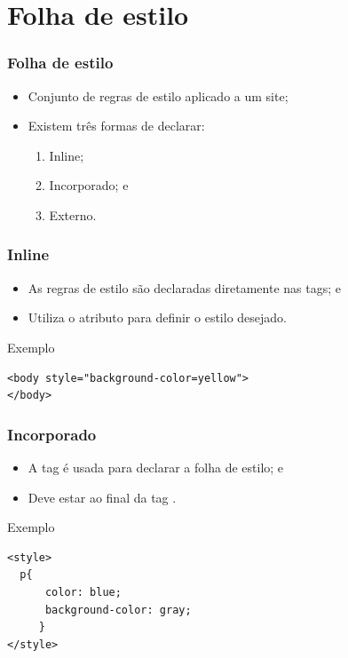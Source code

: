 \documentclass[aspectratio=169]{beamer} %
\begin{document}
\section{Folha de estilo}

\begin{frame}
\frametitle{Folha de estilo}

\begin{itemize}
	\item Conjunto de regras de estilo aplicado a um site;
	\item Existem três formas de declarar:
	\begin{enumerate}
		\item Inline;
		\item Incorporado; e
		\item Externo.
	\end{enumerate} 
\end{itemize}
\end{frame}

\begin{frame}[fragile]
	\frametitle{Inline}
	
	\begin{itemize}
		\item As regras de estilo são declaradas diretamente nas tags; e
		\item Utiliza o atributo  para definir o estilo desejado.
	\end{itemize}\vfill
	
	\begin{exampleblock}{Exemplo}
		\begin{lstlisting}
<body style="background-color=yellow">
</body>
		\end{lstlisting}
	\end{exampleblock}
\end{frame}

\begin{frame}[fragile]
	\frametitle{Incorporado}
	
	\begin{itemize}
		\item A tag  é usada para declarar a folha de estilo; e
		\item \alert{Deve estar ao final da tag} .
	\end{itemize}\vfill
	
	\begin{exampleblock}{Exemplo}
		\begin{lstlisting}
<style>
  p{
      color: blue; 
      background-color: gray; 
     }
</style>
		\end{lstlisting}
	\end{exampleblock}
\end{frame}
\end{document}
